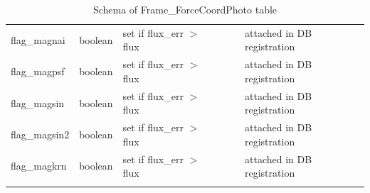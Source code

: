 \documentclass[12pt]{article}
\begin{document}
\begin{table}[thbp]
\begin{center}
{\begin{tabular}{llllll}
flag\_magnai & boolean & set if flux\_err $>$ flux                              &                            &             & attached in DB registration  \\
flag\_magpsf & boolean & set if flux\_err $>$ flux                              &                            &             & attached in DB registration  \\
flag\_magsin & boolean & set if flux\_err $>$ flux                              &                            &             & attached in DB registration  \\
flag\_magsin2 & boolean & set if flux\_err $>$ flux                              &                            &             & attached in DB registration  \\
flag\_magkrn & boolean & set if flux\_err $>$ flux                              &                            &             & attached in DB registration  \\
\hline\\
\end{tabular}
}
\caption{Schema of Frame\_ForceCoordPhoto table}
\end{center}
\end{table}
\end{document}
